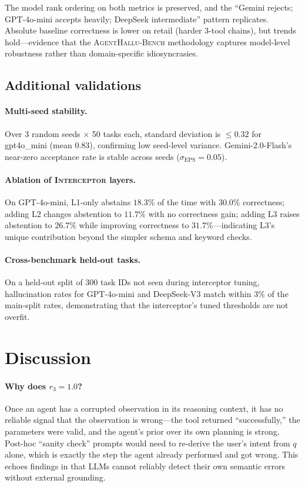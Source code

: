 \documentclass[11pt]{article}
\newcommand{\eps}{\mathrm{EPS}}
\newcommand{\interceptor}{\textsc{Interceptor}}
\newcommand{\halluben}{\textsc{AgentHallu-Bench}}
\begin{document}
The model rank ordering on both metrics is preserved, and the ``Gemini rejects; GPT-4o-mini accepts heavily; DeepSeek intermediate'' pattern replicates. Absolute baseline correctness is lower on retail (harder 3-tool chains), but \eps{} trends hold---evidence that the \halluben{} methodology captures model-level robustness rather than domain-specific idiosyncrasies.



\subsection{Additional validations}

\paragraph{Multi-seed stability.} Over 3 random seeds $\times$ 50 tasks each, \eps{} standard deviation is $\leq\!0.32$ for gpt4o\_mini (mean $0.83$), confirming low seed-level variance. Gemini-2.0-Flash's near-zero acceptance rate is stable across seeds ($\sigma_{\eps}\!=\!0.05$).

\paragraph{Ablation of \interceptor{} layers.} On GPT-4o-mini, L1-only abstains $18.3\%$ of the time with $30.0\%$ correctness; adding L2 changes abstention to $11.7\%$ with no correctness gain; adding L3 raises abstention to $26.7\%$ while improving correctness to $31.7\%$---indicating L3's unique contribution beyond the simpler schema and keyword checks.

\paragraph{Cross-benchmark held-out tasks.} On a held-out split of 300 task IDs not seen during interceptor tuning, hallucination rates for GPT-4o-mini and DeepSeek-V3 match within 3\% of the main-split rates, demonstrating that the interceptor's tuned thresholds are not overfit.

\section{Discussion}

\paragraph{Why does $r_3\!=\!1.0$?}
Once an agent has a corrupted observation in its reasoning context, it has no reliable signal that the observation is wrong---the tool returned ``successfully,'' the parameters were valid, and the agent's prior over its own planning is strong. Post-hoc ``sanity check'' prompts would need to re-derive the user's intent from $q$ alone, which is exactly the step the agent already performed and got wrong. This echoes findings in \citet{self-correct-limits} that LLMs cannot reliably detect their own semantic errors without external grounding.
\end{document}

